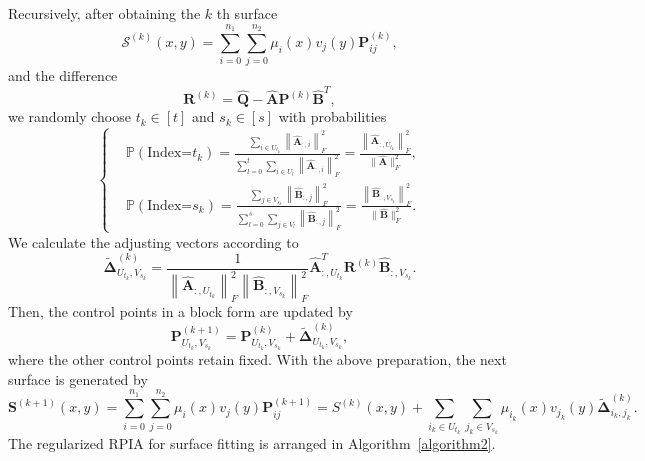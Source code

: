 \documentclass[11pt]{article}
\numberwithin{equation}{section}
\begin{document}
Recursively, after obtaining the $k$ th surface
\begin{equation}\label{3.6}
\mathcal{S}^{(k)}(x, y)=\sum_{i=0}^{n_{1}} \sum_{j=0}^{n_{2}} \mu_{i}(x) v_{j}(y) \boldsymbol{P}_{i j}^{(k)},
\end{equation}
and the difference
\begin{equation}\label{3.7}
\boldsymbol{R}^{(k)}=\hat{\boldsymbol{Q}}-\hat{\boldsymbol{A}} \boldsymbol{P}^{(k)} \hat{\boldsymbol{B}}^T, 
\end{equation}
we randomly choose $t_{k} \in[t]$ and $s_{k} \in[s]$ with probabilities
\begin{equation}
\left\{
\label{3.8}
\begin{aligned}
    &\mathbb{P}\left(\text {Index=} {t_k}\right)=\frac{\sum_{i \in U_{t_k}}\left\|\hat{\boldsymbol{A}}_{:, i}\right\|_F^2}{\sum_{l=0}^t \sum_{i \in U_{l}}\left\|\hat{\boldsymbol{A}}_{:, i}\right\|_F^2}=\frac{\left\|\hat{\boldsymbol{A}}_{:, U_{t_k}}\right\|_F^2}{\|\hat{\boldsymbol{A}}\|_F^2}, \\
    &\mathbb{P}\left(\text {Index=} {s_k}\right)=\frac{\sum_{j \in V_{s_k}}\left\|\hat{\boldsymbol{B}}_{:, j}\right\|_F^2}{\sum_{l=0}^s \sum_{j \in V_{l}}\left\|\hat{\boldsymbol{B}}_{:, j}\right\|_F^2}=\frac{\left\|\hat{\boldsymbol{B}}_{:, V_{s_k}}\right\|_F^2}{\|\hat{\boldsymbol{B}}\|_F^2} .
\end{aligned}
\right.
\end{equation}
We calculate the adjusting vectors according to
\begin{equation}\label{3.9}
\tilde{\boldsymbol\Delta}_{U_{t_k}, V_{s_k}}^{(k)}=\frac{1}{\left\|\hat{\boldsymbol{A}}_{:, U_{t_k}}\right\|_F^2\left\|\hat{\boldsymbol{B}}_{:, V_{s_k}}\right\|_F^2} \hat{\boldsymbol{A}}_{:, U_{t_k}}^T \boldsymbol{R}^{(k)} \hat{\boldsymbol{B}}_{:, V_{s_k}}.
\end{equation}
Then, the control points in a block form are updated by
\begin{equation}\label{3.10}
\boldsymbol{P}_{U_{t_{k}}, V_{s_{k}}}^{(k+1)}=\boldsymbol{P}_{U_{t_{k}}, V_{s_{k}}}^{(k)}+\tilde{\boldsymbol{\Delta}}_{U_{t_{k}}, V_{s_{k}}}^{(k)},
\end{equation}
where the other control points retain fixed. With the above preparation, the next surface is generated by
$$
\boldsymbol{S}^{(k+1)}(x, y)=\sum_{i=0}^{n_{1}} \sum_{j=0}^{n_{2}} \mu_{i}(x) v_{j}(y) \boldsymbol{P}_{i j}^{(k+1)}=S^{(k)}(x, y)+\sum_{i_{k} \in U_{t_{k}}} \sum_{j_{k} \in V_{s_{k}}} \mu_{i_{k}}(x) v_{j_{k}}(y) \tilde{\boldsymbol\Delta}_{i_{k}, j_{k}}^{(k)} .
$$
The regularized RPIA for surface fitting is arranged in Algorithm~\ref{algorithm2}.
\end{document}
